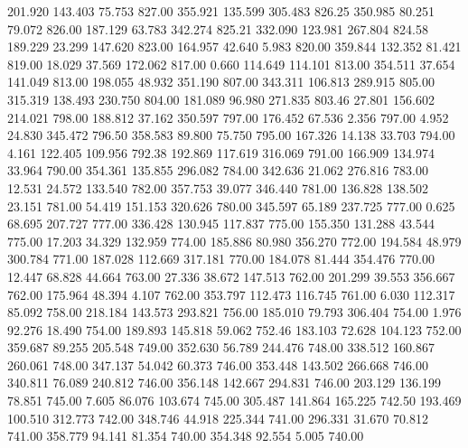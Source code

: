  201.920  143.403   75.753       827.00
 355.921  135.599  305.483       826.25
 350.985   80.251   79.072       826.00
 187.129   63.783  342.274       825.21
 332.090  123.981  267.804       824.58
 189.229   23.299  147.620       823.00
 164.957   42.640    5.983       820.00
 359.844  132.352   81.421       819.00
  18.029   37.569  172.062       817.00
   0.660  114.649  114.101       813.00
 354.511   37.654  141.049       813.00
 198.055   48.932  351.190       807.00
 343.311  106.813  289.915       805.00
 315.319  138.493  230.750       804.00
 181.089   96.980  271.835       803.46
  27.801  156.602  214.021       798.00
 188.812   37.162  350.597       797.00
 176.452   67.536    2.356       797.00
   4.952   24.830  345.472       796.50
 358.583   89.800   75.750       795.00
 167.326   14.138   33.703       794.00
   4.161  122.405  109.956       792.38
 192.869  117.619  316.069       791.00
 166.909  134.974   33.964       790.00
 354.361  135.855  296.082       784.00
 342.636   21.062  276.816       783.00
  12.531   24.572  133.540       782.00
 357.753   39.077  346.440       781.00
 136.828  138.502   23.151       781.00
  54.419  151.153  320.626       780.00
 345.597   65.189  237.725       777.00
   0.625   68.695  207.727       777.00
 336.428  130.945  117.837       775.00
 155.350  131.288   43.544       775.00
  17.203   34.329  132.959       774.00
 185.886   80.980  356.270       772.00
 194.584   48.979  300.784       771.00
 187.028  112.669  317.181       770.00
 184.078   81.444  354.476       770.00
  12.447   68.828   44.664       763.00
  27.336   38.672  147.513       762.00
 201.299   39.553  356.667       762.00
 175.964   48.394    4.107       762.00
 353.797  112.473  116.745       761.00
   6.030  112.317   85.092       758.00
 218.184  143.573  293.821       756.00
 185.010   79.793  306.404       754.00
   1.976   92.276   18.490       754.00
 189.893  145.818   59.062       752.46
 183.103   72.628  104.123       752.00
 359.687   89.255  205.548       749.00
 352.630   56.789  244.476       748.00
 338.512  160.867  260.061       748.00
 347.137   54.042   60.373       746.00
 353.448  143.502  266.668       746.00
 340.811   76.089  240.812       746.00
 356.148  142.667  294.831       746.00
 203.129  136.199   78.851       745.00
   7.605   86.076  103.674       745.00
 305.487  141.864  165.225       742.50
 193.469  100.510  312.773       742.00
 348.746   44.918  225.344       741.00
 296.331   31.670   70.812       741.00
 358.779   94.141   81.354       740.00
 354.348   92.554    5.005       740.00
